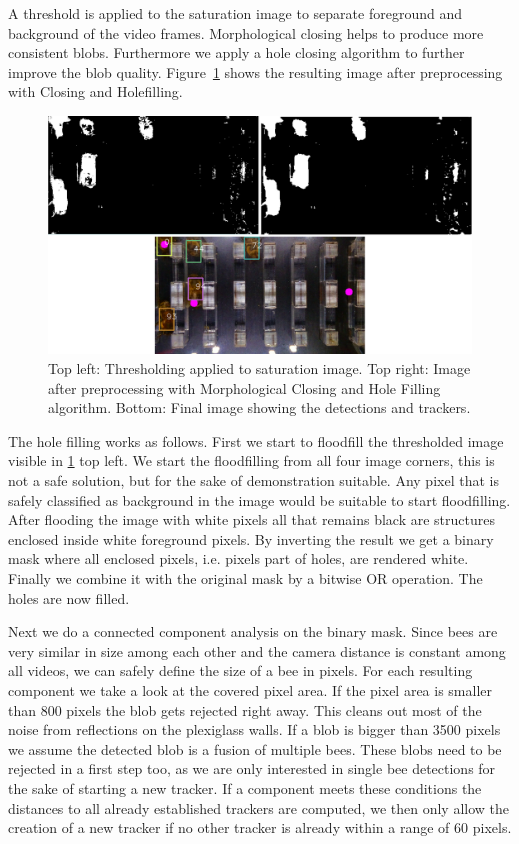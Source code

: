 \documentclass[10pt,a4paper]{article}
\begin{document}
A threshold is applied to the saturation image to separate foreground and background of the video frames. Morphological closing helps to produce more consistent blobs. Furthermore we apply a hole closing algorithm to further improve the blob quality. Figure~\ref{fig:preprocessing} shows the resulting image after preprocessing with Closing and Holefilling. 

\begin{figure}
\label{fig:preprocessing}
\center
\includegraphics[width=1.2\textwidth]{preprocessing}
\caption{Top left: Thresholding applied to saturation image. Top right: Image after preprocessing with Morphological Closing and Hole Filling algorithm. Bottom: Final image showing the detections and trackers.}
\end{figure}

The hole filling works as follows. First we start to floodfill the thresholded image visible in \ref{fig:preprocessing} top left. We start the floodfilling from all four image corners, this is not a safe solution, but for the sake of demonstration suitable. Any pixel that is safely classified as background in the image would be suitable to start floodfilling. After flooding the image with white pixels all that remains black are structures enclosed inside white foreground pixels. By inverting the result we get a binary mask where all enclosed pixels, i.e. pixels part of holes, are rendered white. Finally we combine it with the original mask by a bitwise OR operation. The holes are now filled. 

Next we do a connected component analysis on the binary mask. Since bees are very similar in size among each other and the camera distance is constant among all videos, we can safely define the size of a bee in pixels. For each resulting component we take a look at the covered pixel area. If the pixel area is smaller than 800 pixels the blob gets rejected right away. This cleans out most of the noise from reflections on the plexiglass walls. If a blob is bigger than 3500 pixels we assume the detected blob is a fusion of multiple bees. These blobs need to be rejected in a first step too, as we are only interested in single bee detections for the sake of starting a new tracker. If a component meets these conditions the distances to all already established trackers are computed, we then only allow the creation of a new tracker if no other tracker is already within a range of 60 pixels.
\end{document}
